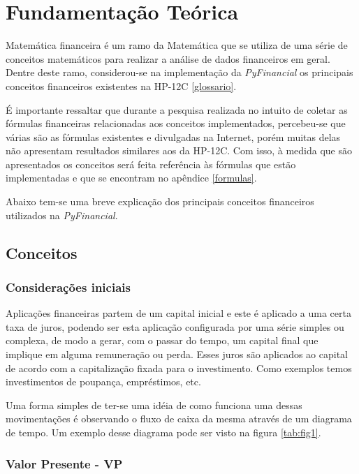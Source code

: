 \chapter{Fundamentação Teórica}

Matemática financeira é um ramo da Matemática que se utiliza de uma série de conceitos matemáticos para realizar a análise de dados financeiros em geral. Dentre deste ramo,  considerou-se na implementação da \textit{PyFinancial} os principais conceitos financeiros existentes na HP-12C \ref{glossario}.

É importante ressaltar que durante a pesquisa realizada no intuito de coletar as fórmulas financeiras relacionadas aos conceitos implementados, percebeu-se que várias são as fórmulas existentes e divulgadas na Internet, porém muitas delas não apresentam resultados similares aos da HP-12C. Com isso, à medida que são apresentados os conceitos será feita referência às fórmulas que estão implementadas e que se encontram no apêndice \ref{formulas}.

Abaixo tem-se uma breve explicação dos principais conceitos financeiros utilizados na \textit{PyFinancial}.

\section{Conceitos}

\subsection{Considerações iniciais}

Aplicações financeiras partem de um capital inicial e este é aplicado a uma certa taxa de juros, podendo ser esta aplicação configurada por uma série simples ou complexa, de modo a gerar, com o passar do tempo, um capital final que implique em alguma remuneração ou perda. Esses juros são aplicados ao capital de acordo com a capitalização fixada para o investimento. Como exemplos temos investimentos de poupança, empréstimos, etc.

Uma forma simples de ter-se uma idéia de como funciona uma dessas movimentações é observando o fluxo de caixa da mesma através de um diagrama de tempo. Um exemplo desse diagrama pode ser visto na figura \ref{tab:fig1}.

\subsection{Valor Presente - VP}

